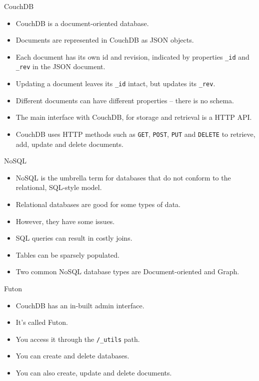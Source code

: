 \begin{frame}{CouchDB}
	\begin{itemize}
		\item CouchDB is a document-oriented database.
		\item Documents are represented in CouchDB as JSON objects.
		\item Each document has its own id and revision, indicated by properties \texttt{_id} and \texttt{_rev} in the JSON document.
		\item Updating a document leaves its \texttt{_id} intact, but updates its \texttt{_rev}.
		\item Different documents can have different properties -- there is no schema.
		\item The main interface with CouchDB, for storage and retrieval is a HTTP API.
		\item CouchDB uses HTTP methods such as \texttt{GET}, \texttt{POST}, \texttt{PUT} and \texttt{DELETE} to retrieve, add, update and delete documents.
	\end{itemize}
\end{frame}


\begin{frame}{NoSQL}
	\begin{itemize}
		\item NoSQL is the umbrella term for databases that do not conform to the relational, SQL-style model.
		\item Relational databases are good for some types of data.
		\item However, they have some issues.
		\item SQL queries can result in costly joins.
		\item Tables can be sparsely populated.
		\item Two common NoSQL database types are Document-oriented and Graph.
	\end{itemize}
\end{frame}


\begin{frame}{Futon}
	\begin{itemize}
		\item CouchDB has an in-built admin interface.
		\item It's called Futon.
		\item You access it through the \texttt{/_utils} path.
		\item You can create and delete databases.
		\item You can also create, update and delete documents.
	\end{itemize}
\end{frame}


